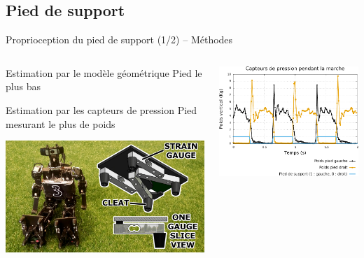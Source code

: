 
\subsection{Pied de support}

\begin{frame}{Proprioception du pied de support (1/2) -- Méthodes}
    \begin{columns}
        \begin{column}{0.4\linewidth}
            \begin{block}{Estimation par le modèle géométrique}
                Pied le plus bas
            \end{block}
            \begin{block}{Estimation par les capteurs de pression}
                Pied mesurant le plus de poids
            \end{block}
            \vspace{1.0em}
            \centering
            \includegraphics[width=1.0\linewidth]{../media/pressures1.png}
        \end{column}
        \begin{column}{0.6\linewidth}
            \centering
            \includegraphics[type=pdf,ext=.pdf,read=.pdf,width=1.0\linewidth]{../plot/pressure_sensors}
        \end{column}
    \end{columns}
\end{frame}


